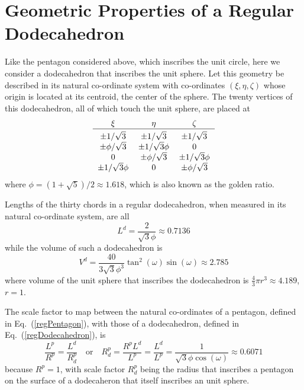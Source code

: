 \section{Geometric Properties of a Regular Dodecahedron}

Like the pentagon considered above, which inscribes the unit circle, here we consider a dodecahedron that inscribes the unit sphere.  Let this geometry be described in its natural co-ordinate system with co-ordinates $(\xi , \eta , \zeta )$ whose origin is located at its centroid, the center of the sphere.  The twenty vertices of this dodecahedron, all of which touch the unit sphere, are placed at
\begin{equation}
\begin{tabular}{ccc}
	$\xi$ & $\eta$ & $\zeta$ \\ \hline
	$\pm 1 / \sqrt{3}$ & $\pm 1 / \sqrt{3}$ & $\pm 1 / \sqrt{3}^{\vphantom{|}}$ \\
	$\pm \phi / \sqrt{3}$ & $\pm 1 / \sqrt{3} \phi$ & 0 \\
	0 & $\pm \phi / \sqrt{3}$ & $\pm 1 / \sqrt{3} \phi$ \\
	$\pm 1 / \sqrt{3} \phi$ & 0 & $\pm \phi / \sqrt{3}$
\end{tabular}
\label{regDodecahedron}
\end{equation}
where $\phi = (1 + \sqrt{5})/2 \approx 1.618$, which is also known as the golden ratio.

Lengths of the thirty chords in a regular dodecahedron, when measured in its natural co-ordinate system, are all
\begin{equation}
	L^d = \frac{2}{\sqrt{3} \phi} \approx 0.7136
	\label{regDodecahedronLength}
\end{equation}
while the volume of such a dodecahedron is
\begin{equation}
	V^d = \frac{40}{3 \sqrt{3} \phi^3} \tan^2 ( \omega ) \sin ( \omega ) \approx 2.785
\label{regDodecahedronVolume}
\end{equation}
where volume of the unit sphere that inscribes the dodecahedron is $\tfrac{4}{3} \pi r^3 \approx 4.189$, $r=1$.

The scale factor to map between the natural co-ordinates of a pentagon, defined in Eq.~(\ref{regPentagon}), with those of a dodecahedron, defined in Eq.~(\ref{regDodecahedron}), is
\begin{equation}
	\frac{L^p}{R^p} = \frac{L^d}{R^p_d} 
	\quad \text{or} \quad
	R^p_d = \frac{R^p L^d}{L^p} = \frac{L^d}{L^p} = 
	\frac{1}{\sqrt{3} \phi \cos (\omega)} \approx 0.6071
	\label{scaleFactor}
\end{equation}
because $R^p = 1$, with scale factor $R^p_d$ being the radius that inscribes a pentagon on the surface of a dodecaheron that itself inscribes an unit sphere.

